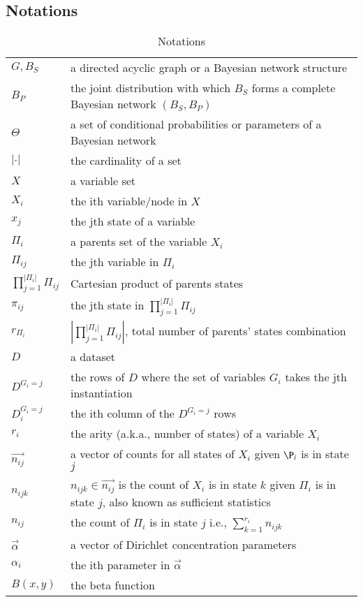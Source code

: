 \subsection{Notations}
\begin{table}[]
\centering
\caption{Notations}
\label{my-label}
\begin{tabular}{ll}
\hline
$G, B_S$ &  a directed acyclic graph or a Bayesian network structure\\
$B_P$ & the joint distribution with which $B_S$ forms a complete Bayesian network $(B_S, B_P)$ \\
$\Theta$ &  a set of conditional probabilities or parameters of a Bayesian network\\
$|\cdot|$ & the cardinality of a set \\
$X$ & a variable set \\ 
$X_i$ & the ith variable/node in $X$ \\ 
$x_j$ & the jth state of a variable \\ 
$\Pi_i$ & a parents set of the variable $X_i$ \\ 
$\Pi_{ij}$ & the jth variable in $\Pi_i$ \\
$\prod_{j=1}^{|\Pi_i|} \Pi_{ij}$ & Cartesian product of parents states \\
$\pi_{ij}$ & the jth state in $\prod_{j=1}^{|\Pi_i|} \Pi_{ij}$ \\
$r_{\Pi_i}$ & $|\prod_{j=1}^{|\Pi_i|} \Pi_{ij}|$, total number of parents' states combination\\
$D$ & a dataset \\ 
$D^{G_i = j}$ & the rows of $D$ where the set of variables $G_i$ takes the jth instantiation \\
$D_i^{G_i = j}$ & the ith column of the $D^{G_i = j}$ rows \\
$r_i$ & the arity (a.k.a., number of states) of a variable $X_i$ \\ 
$\vec{n_{ij}}$ & a vector of counts for all states of $X_i$ given $\P_i$ is in state $j$ \\
$n_{ijk}$ & $n_{ijk} \in \vec{n_{ij}}$ is the count of $X_i$ is in state $k$ given $\Pi_i$ is in state $j$, also known as sufficient statistics\\ 
$n_{ij}$ & the count of $\Pi_i$ is in state $j$ i.e., $\sum_{k =1}^{r_i} n_{ijk}$ \\
$\vec{\alpha}$ & a vector of Dirichlet concentration parameters \\ 
$\alpha_i$ & the ith parameter in $\vec{\alpha}$ \\ 
$B(x, y)$ & the beta function \\ \hline
\end{tabular}
\end{table}

